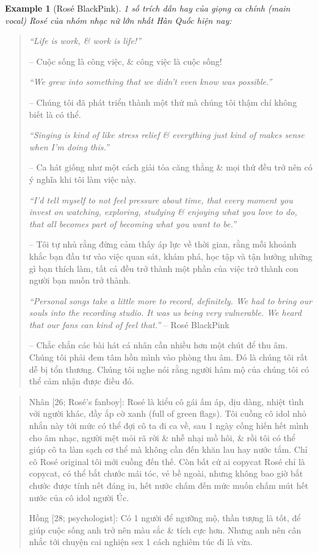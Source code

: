 \documentclass[12pt]{article}
\newtheorem{example}{Example}
\begin{document}
\begin{example}[{\sc Ros\'e BlackPink}]
	1 số trích dẫn hay của giọng ca chính (main vocal) Ros\'e của nhóm nhạc nữ lớn nhất Hàn Quốc hiện nay:
\end{example}
\begin{quotation}
	{\it``Life is work, \& work is life!''}
	
	-- Cuộc sống là công việc, \& công việc là cuộc sống!
	
	{\it``We grew into something that we didn't even know was possible.''}
	
	-- Chúng tôi đã phát triển thành một thứ mà chúng tôi thậm chí không biết là có thể.
	
	{\it``Singing is kind of like stress relief \& everything just kind of makes sense when I'm doing this.''}
	
	-- Ca hát giống như một cách giải tỏa căng thẳng \& mọi thứ đều trở nên có ý nghĩa khi tôi làm việc này.
	
	{\it``I'd tell myself to not feel pressure about time, that every moment you invest on watching, exploring, studying \& enjoying what you love to do, that all becomes part of becoming what you want to be.''}
	
	-- Tôi tự nhủ rằng đừng cảm thấy áp lực về thời gian, rằng mỗi khoảnh khắc bạn đầu tư vào việc quan sát, khám phá, học tập và tận hưởng những gì bạn thích làm, tất cả đều trở thành một phần của việc trở thành con người bạn muốn trở thành.
	
	{\it``Personal songs take a little more to record, definitely. We had to bring our souls into the recording studio. It was us being very vulnerable. We heard that our fans can kind of feel that.''} -- {\sc Ros\'e BlackPink}
	
	-- Chắc chắn các bài hát cá nhân cần nhiều hơn một chút để thu âm. Chúng tôi phải đem tâm hồn mình vào phòng thu âm. Đó là chúng tôi rất dễ bị tổn thương. Chúng tôi nghe nói rằng người hâm mộ của chúng tôi có thể cảm nhận được điều đó.
\end{quotation}

\begin{quote}
	{\sf Nhân [26; Ros\'e's fanboy]}: Rosé là kiểu cô gái ấm áp, dịu dàng, nhiệt tình với người khác, đầy ắp cờ xanh (full of green flags). Tôi cuồng cô idol nhỏ nhắn này tới mức có thể đợi cô ta đi ca về, sau 1 ngày cống hiến hết mình cho âm nhạc, người mệt mỏi rã rời \& nhễ nhại mồ hôi, \& rồi tôi có thể giúp cô ta làm sạch cơ thể mà không cần đến khăn lau hay nước tắm. Chỉ cô Rosé original tôi mới cuồng đến thế. Còn bất cứ ai copycat Rosé chỉ là copycat, có thể bắt chước mái tóc, vẻ bề ngoài, nhưng không bao giờ bắt chước được tính nết đáng iu, hết nước chấm đến mức muốn chấm mút hết nước của cô idol người Úc.
	
	{\sf Hồng [28; psychologist]}: Có 1 người để ngưỡng mộ, thần tượng là tốt, để giúp cuộc sống anh trở nên màu sắc \& tích cực hơn. Nhưng anh nên cân nhắc tới chuyện cai nghiện sex 1 cách nghiêm túc đi là vừa.
\end{quote}
\end{document}
